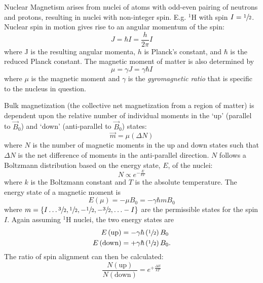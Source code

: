 Nuclear Magnetism arises from nuclei of atoms with odd-even pairing of neutrons and protons, resulting in nuclei with non-integer spin. E.g. $^1$H with spin $I=\sfrac{1}{2}$. Nuclear spin in motion gives rise to an angular momentum of the spin:
\begin{equation}
J=\hbar I = \frac{h}{2\pi}I
\end{equation}
where J is the resulting angular momenta, $h$ is Planck's constant, and $\hbar$ is the reduced Planck constant. 
The magnetic moment of matter is also determined by
\begin{equation}
\mu = \gamma J = \gamma \hbar I
\end{equation}
where $\mu$ is the magnetic moment and $\gamma$ is the \textit{gyromagnetic ratio} that is specific to the nucleus in question.

Bulk magnetization (the collective net magnetization from a region of matter) is dependent upon the relative number of individual moments in the `up' (parallel to $\vec{B}_0$) and `down' (anti-parallel to $\vec{B}_0$) states:
\begin{equation}
\vec{m} = \mu (\Delta N)
\end{equation}
where $N$ is the number of magnetic moments in the up and down states such that $\Delta N$ is the net difference of moments in the anti-parallel direction.
$N$ follows a Boltzmann distribution based on the energy state, $E$, of the nuclei:
\begin{equation}
N\propto e^{-\frac{E}{kT}}
\end{equation}
where $k$ is the Boltzmann constant and $T$ is the absolute temperature. The energy state of a magnetic moment is
\begin{equation}
E(\mu) = -\mu B_0 = -\gamma \hbar m B_0
\end{equation}
where $m = \left\{I \ldots\sfrac{3}{2}, \sfrac{1}{2}, -\sfrac{1}{2}, -\sfrac{3}{2},\ldots -I\right\}$ are the permissible states for the spin $I$. Again assuming $^1$H nuclei, the two energy states are
\begin{align}
E\left(\text{up}\right) &= - \gamma \hbar \left(\sfrac{1}{2}\right) B_0 \\
E\left(\text{down}\right) &= + \gamma \hbar \left(\sfrac{1}{2}\right) B_0 .
\end{align}
The ratio of spin alignment can then be calculated:
\begin{equation}
\frac{N\left(\text{up}\right)}{N\left(\text{down}\right)} = e^{+ \frac{\Delta E}{kT}} \label{eq:mri:ratio}
\end{equation}
